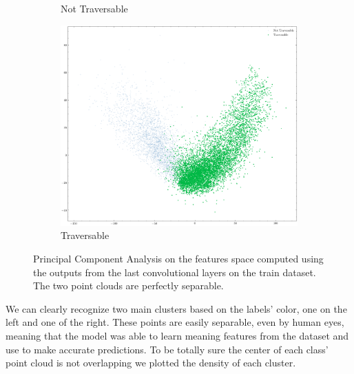 \documentclass[../document.tex]{subfiles}
\begin{document}
\begin{figure} [htbp]
\begin{subfigure}[b]{0.48\textwidth}
        \caption{Not Traversable}
    \end{subfigure}
    \begin{subfigure}[b]{0.48\textwidth}
        \includegraphics[width=\linewidth]{../img/5/pca/pca-1.png}
        \caption{Traversable}
    \end{subfigure}
\caption{Principal Component Analysis on the features space computed using the outputs from the last convolutional layers on the train dataset. The two point clouds are perfectly separable.}
\label{fig : pca-train-set}
\end{figure}
We can clearly recognize two main clusters based on the labels' color, one on the left and one of the right. These points are easily separable, even by human eyes, meaning that the model was able to learn meaning features from the dataset and use to make accurate predictions. To be totally sure the center of each class' point cloud is not overlapping we plotted the density of each cluster.
\end{document}
